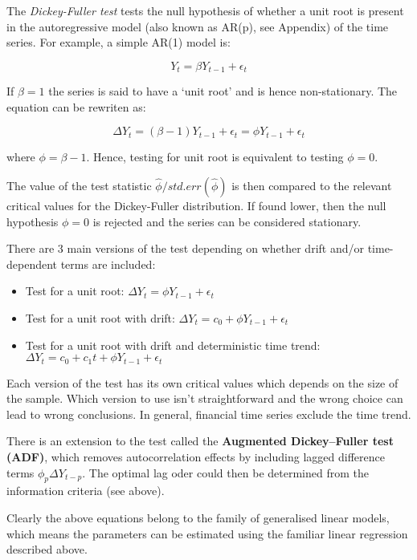 \documentclass{article}
\providecommand{\tightlist}{%
      \setlength{\itemsep}{0pt}\setlength{\parskip}{0pt}}
\begin{document}
The \emph{Dickey-Fuller test} tests the null hypothesis of whether a
unit root is present in the autoregressive model (also known as AR(p),
see Appendix) of the time series. For example, a simple AR(1) model is:

\[
Y_t = \beta Y_{t-1} + \epsilon_t
\]

If \(\beta=1\) the series is said to have a `unit root' and is hence
non-stationary. The equation can be rewriten as:

\[
\Delta Y_t = (\beta - 1) Y_{t-1} + \epsilon_t = \phi Y_{t-1} + \epsilon_t
\]

where \(\phi= \beta-1\). Hence, testing for unit root is equivalent to
testing \(\phi=0\).

The value of the test statistic \(\hat{\phi}/std.err(\hat{\phi})\) is
then compared to the relevant critical values for the Dickey-Fuller
distribution. If found lower, then the null hypothesis \(\phi=0\) is
rejected and the series can be considered stationary.

There are 3 main versions of the test depending on whether drift and/or
time-dependent terms are included:

\begin{itemize}
\tightlist
\item
  Test for a unit root: \(\Delta Y_t = \phi Y_{t-1} + \epsilon_t\)
\item
  Test for a unit root with drift:
  \(\Delta Y_t = c_0 + \phi Y_{t-1} + \epsilon_t\)
\item
  Test for a unit root with drift and deterministic time trend:
  \(\Delta Y_t = c_0 + c_1 t + \phi Y_{t-1} + \epsilon_t\)
\end{itemize}

Each version of the test has its own critical values which depends on
the size of the sample. Which version to use isn't straightforward and
the wrong choice can lead to wrong conclusions. In general, financial
time series exclude the time trend.

There is an extension to the test called the \textbf{Augmented
Dickey--Fuller test (ADF)}, which removes autocorrelation effects by
including lagged difference terms \(\phi_p \Delta Y_{t-p}\). The optimal
lag oder could then be determined from the information criteria (see
above).

Clearly the above equations belong to the family of generalised linear
models, which means the parameters can be estimated using the familiar
linear regression described above.
\end{document}
